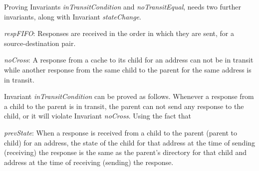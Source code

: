 Proving Invariants \textit{inTransitCondition} and \textit{noTransitEqual},
needs two further invariants, along with Invariant \textit{stateChange}.

\begin{inv}
\textit{respFIFO}: Responses are received in the order in which they are sent,
for a source-destination pair.
\label{respFIFO}
\end{inv}

\begin{inv}
\textit{noCross}: A response from a cache to its child for an address can not
be in transit while another response from the same child to the parent for the
same address is in transit.
\label{noCross}
\end{inv}

Invariant \textit{inTransitCondition} can be proved as follows. Whenever a
response from a child to the parent is in transit, the parent can not send any
response to the child, or it will violate Invariant \textit{noCross}. Using the fact that 

\begin{inv}
\textit{prevState}: When a response is received from a child to the parent
(parent to child) for an address, the state of the child for that address at
the time of sending (receiving) the response is the same as the parent's
directory for that child and address at the time of receiving (sending) the
response.
\label{prevState}
\end{inv}



%
%
%
